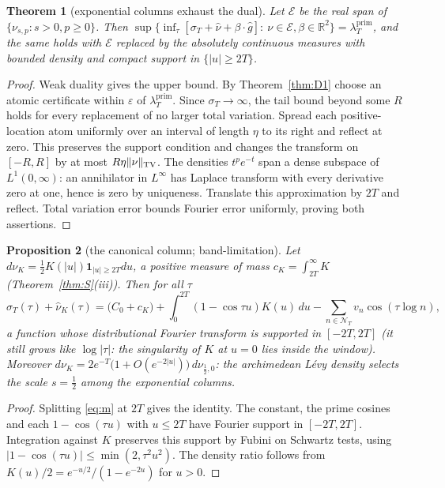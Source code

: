 \documentclass[10pt]{amsart}
\newtheorem{theorem}{Theorem}[section]
\newtheorem{proposition}[theorem]{Proposition}
\theoremstyle{definition}
\theoremstyle{remark}
\newcommand{\R}{\mathbb R}
\newcommand{\lamP}{\lambda^{\mathrm{prim}}_T}
\newcommand{\sT}{\sigma_T}
\newcommand{\nuh}{\widehat\nu}
\newcommand{\NT}{\mathcal N_T}
\begin{document}
\begin{theorem}[exponential columns exhaust the dual]\label{thm:E}
Let $\mathcal E$ be the real span of $\{\nu_{s,p}:s>0,p\ge0\}$. Then
$\sup\{\inf_\tau[\sT+\nuh+\beta\cdot\widehat g]:\ \nu\in\mathcal E,\beta\in\R^2\}=\lamP$, and the same
holds with $\mathcal E$ replaced by the absolutely continuous measures with bounded density and
compact support in $\{|u|\ge2T\}$.
\end{theorem}
\begin{proof}
Weak duality gives the upper bound. By Theorem~\ref{thm:D1} choose an
atomic certificate within $\varepsilon$ of $\lamP$. Since $\sT\to\infty$,
the tail bound beyond some $R$ holds for every replacement of no larger
total variation. Spread each positive-location atom uniformly over an
interval of length $\eta$ to its right and reflect at zero. This preserves
the support condition and changes the transform on $[-R,R]$ by at most
$R\eta\|\nu\|_{\rm TV}$. The densities $t^pe^{-t}$ span a dense subspace
of $L^1(0,\infty)$: an annihilator in $L^\infty$ has Laplace transform
with every derivative zero at one, hence is zero by uniqueness.
Translate this approximation by $2T$ and reflect. Total variation error
bounds Fourier error uniformly, proving both assertions.
\end{proof}


\begin{proposition}[the canonical column; band-limitation]\label{prop:M}
Let $d\nu_K=\frac12K(|u|)\mathbf 1_{|u|\ge2T}du$, a positive measure of mass
$c_K=\int_{2T}^\infty K$ (Theorem~\ref{thm:S}(iii)). Then for all $\tau$
\[
\sT(\tau)+\nuh_K(\tau)=\big(C_0+c_K\big)+\int_0^{2T}(1-\cos\tau u)K(u)\,du-\sum_{n\in\NT}v_n\cos(\tau\log n),
\]
a function whose distributional Fourier transform is supported in $[-2T,2T]$ (it still grows
like $\log|\tau|$: the singularity of $K$ at $u=0$ lies inside the window). Moreover
$d\nu_K=2e^{-T}\big(1+O(e^{-2|u|})\big)\,d\nu_{\frac12,0}$:
the archimedean L\'evy density selects the scale $s=\frac12$ among the exponential columns.
\end{proposition}
\begin{proof}
Splitting \eqref{eq:m} at $2T$ gives the identity. The constant,
the prime cosines and each $1-\cos(\tau u)$ with $u\le2T$ have
Fourier support in $[-2T,2T]$. Integration against $K$ preserves
this support by Fubini on Schwartz tests, using
$|1-\cos(\tau u)|\le\min(2,\tau^2u^2)$. The density ratio follows
from $K(u)/2=e^{-u/2}/(1-e^{-2u})$ for $u>0$.
\end{proof}
\end{document}
